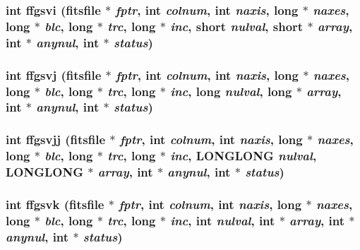 \subsubsection{\setlength{\rightskip}{0pt plus 5cm}int ffgsvi (\bf{fitsfile} $\ast$ {\em fptr}, int {\em colnum}, int {\em naxis}, long $\ast$ {\em naxes}, long $\ast$ {\em blc}, long $\ast$ {\em trc}, long $\ast$ {\em inc}, short {\em nulval}, short $\ast$ {\em array}, int $\ast$ {\em anynul}, int $\ast$ {\em status})}\label{src_2fitsio_8h_f6fc8403f2e424f4940ccbb2ef1f13c5}


\subsubsection{\setlength{\rightskip}{0pt plus 5cm}int ffgsvj (\bf{fitsfile} $\ast$ {\em fptr}, int {\em colnum}, int {\em naxis}, long $\ast$ {\em naxes}, long $\ast$ {\em blc}, long $\ast$ {\em trc}, long $\ast$ {\em inc}, long {\em nulval}, long $\ast$ {\em array}, int $\ast$ {\em anynul}, int $\ast$ {\em status})}\label{src_2fitsio_8h_4dab3a6e95489f607d0e69dc0c5b0de2}


\subsubsection{\setlength{\rightskip}{0pt plus 5cm}int ffgsvjj (\bf{fitsfile} $\ast$ {\em fptr}, int {\em colnum}, int {\em naxis}, long $\ast$ {\em naxes}, long $\ast$ {\em blc}, long $\ast$ {\em trc}, long $\ast$ {\em inc}, \bf{LONGLONG} {\em nulval}, \bf{LONGLONG} $\ast$ {\em array}, int $\ast$ {\em anynul}, int $\ast$ {\em status})}\label{src_2fitsio_8h_b11dce310951c2540223e1e021e4257d}


\subsubsection{\setlength{\rightskip}{0pt plus 5cm}int ffgsvk (\bf{fitsfile} $\ast$ {\em fptr}, int {\em colnum}, int {\em naxis}, long $\ast$ {\em naxes}, long $\ast$ {\em blc}, long $\ast$ {\em trc}, long $\ast$ {\em inc}, int {\em nulval}, int $\ast$ {\em array}, int $\ast$ {\em anynul}, int $\ast$ {\em status})}\label{src_2fitsio_8h_af5457b13c2e0db0be99a6dd61c025dc}



